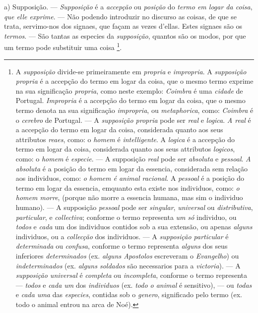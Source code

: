 a) Supposição. --- \emph{Supposição} é a \emph{accepção} ou \emph{posição} do \emph{termo em logar da coisa}, \emph{que elle exprime}. --- Não podendo introduzir no discurso as coisas, de que se trata, servimo-nos dos signaes, que façam as vezes d'ellas. Estes signaes são os \emph{termos}. --- São tantas as especies da \emph{supposição}, quantos são os modos, por que um termo pode substituir uma coisa \footnote{A \emph{supposição} divide-se primeiramente em \emph{propria} e \emph{impropria}. A \emph{supposição propria} é a accepção do termo em logar da coisa, que o mesmo termo exprime na sua significação \emph{propria}, como neste exemplo: \emph{Coimbra} é uma \emph{cidade} de Portugal. \emph{Impropria} é a accepção do termo em logar da coisa, que o mesmo termo denota na sua significação \emph{impropria}, ou \emph{metaphorica}, como: \emph{Coimbra} é o \emph{cerebro} de Portugal. --- A \emph{supposição propria} pode ser \emph{real} e \emph{logica}. \emph{A real} é a accepção do termo em logar da coisa, considerada quanto aos seus attributos \emph{reaes}, como: o \emph{homem} é \emph{intelligente}. A \emph{logica} é a accepção do termo em logar da coisa, considerada quanto aos seus attributos \emph{logicos}, como: o \emph{homem} é \emph{especie}. --- A supposição \emph{real} pode ser \emph{absoluta} e \emph{pessoal}. \emph{A absoluta} é a posição do termo em logar da essencia, considerada sem relação aos individuos, como: \emph{o homem é animal racional}. A \emph{pessoal} é a posição do termo em logar da essencia, emquanto esta existe nos individuos, como: \emph{o homem morre}, (porque não morre a essencia humana, mas sim o individuo humano). --- A supposição \emph{pessoal} pode ser \emph{singular}, \emph{universal} ou \emph{distributiva}, \emph{particular}, e \emph{collectiva}; conforme o termo representa \emph{um só} individuo, ou \emph{todos} e \emph{cada} um dos individuos contidos sob a sua extensão, ou apenas \emph{alguns} individuos, ou a \emph{collecção} dos individuos. --- A \emph{supposição particular} é \emph{determinada} ou \emph{confusa}, conforme o termo representa \emph{alguns} dos seus inferiores \emph{determinados} (ex. \emph{alguns Apostolos} escreveram o \emph{Evangelho}) ou \emph{indeterminados} (ex. \emph{alguns soldados} são necessarios para a \emph{victoria}). --- A \emph{supposição universal} é \emph{completa} ou \emph{incompleta}, conforme o termo representa --- \emph{todos} e \emph{cada um} dos \emph{individuos} (ex. \emph{todo o animal} é sensitivo), --- ou \emph{todas} e \emph{cada uma} das \emph{especies}, contidas sob o \emph{genero}, significado pelo termo (ex. todo o animal entrou na arca de Noé).}.

